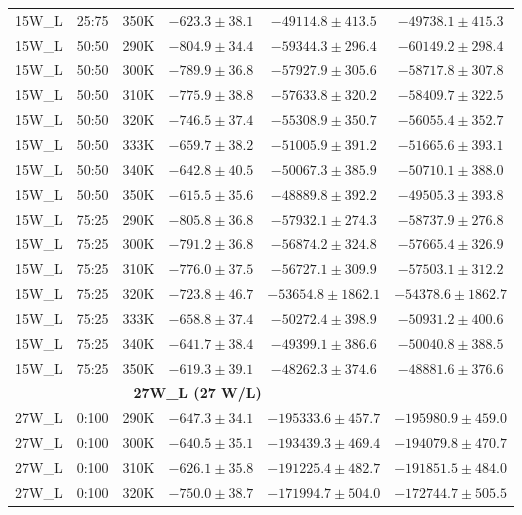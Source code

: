 \begin{longtable}{|c|c|c|c|c|c|}
15W\_L & 25:75 & 350K & $-623.3 \pm 38.1$ & $-49114.8 \pm 413.5$ & $-49738.1 \pm 415.3$ \\
15W\_L & 50:50 & 290K & $-804.9 \pm 34.4$ & $-59344.3 \pm 296.4$ & $-60149.2 \pm 298.4$ \\
15W\_L & 50:50 & 300K & $-789.9 \pm 36.8$ & $-57927.9 \pm 305.6$ & $-58717.8 \pm 307.8$ \\
15W\_L & 50:50 & 310K & $-775.9 \pm 38.8$ & $-57633.8 \pm 320.2$ & $-58409.7 \pm 322.5$ \\
15W\_L & 50:50 & 320K & $-746.5 \pm 37.4$ & $-55308.9 \pm 350.7$ & $-56055.4 \pm 352.7$ \\
15W\_L & 50:50 & 333K & $-659.7 \pm 38.2$ & $-51005.9 \pm 391.2$ & $-51665.6 \pm 393.1$ \\
15W\_L & 50:50 & 340K & $-642.8 \pm 40.5$ & $-50067.3 \pm 385.9$ & $-50710.1 \pm 388.0$ \\
15W\_L & 50:50 & 350K & $-615.5 \pm 35.6$ & $-48889.8 \pm 392.2$ & $-49505.3 \pm 393.8$ \\
15W\_L & 75:25 & 290K & $-805.8 \pm 36.8$ & $-57932.1 \pm 274.3$ & $-58737.9 \pm 276.8$ \\
15W\_L & 75:25 & 300K & $-791.2 \pm 36.8$ & $-56874.2 \pm 324.8$ & $-57665.4 \pm 326.9$ \\
15W\_L & 75:25 & 310K & $-776.0 \pm 37.5$ & $-56727.1 \pm 309.9$ & $-57503.1 \pm 312.2$ \\
15W\_L & 75:25 & 320K & $-723.8 \pm 46.7$ & $-53654.8 \pm 1862.1$ & $-54378.6 \pm 1862.7$ \\
15W\_L & 75:25 & 333K & $-658.8 \pm 37.4$ & $-50272.4 \pm 398.9$ & $-50931.2 \pm 400.6$ \\
15W\_L & 75:25 & 340K & $-641.7 \pm 38.4$ & $-49399.1 \pm 386.6$ & $-50040.8 \pm 388.5$ \\
15W\_L & 75:25 & 350K & $-619.3 \pm 39.1$ & $-48262.3 \pm 374.6$ & $-48881.6 \pm 376.6$ \\
\midrule \multicolumn{5}{c}{\textbf{27W\_L (27 W/L)}} \\ \midrule
27W\_L & 0:100 & 290K & $-647.3 \pm 34.1$ & $-195333.6 \pm 457.7$ & $-195980.9 \pm 459.0$ \\
27W\_L & 0:100 & 300K & $-640.5 \pm 35.1$ & $-193439.3 \pm 469.4$ & $-194079.8 \pm 470.7$ \\
27W\_L & 0:100 & 310K & $-626.1 \pm 35.8$ & $-191225.4 \pm 482.7$ & $-191851.5 \pm 484.0$ \\
27W\_L & 0:100 & 320K & $-750.0 \pm 38.7$ & $-171994.7 \pm 504.0$ & $-172744.7 \pm 505.5$ \\

\end{longtable}
